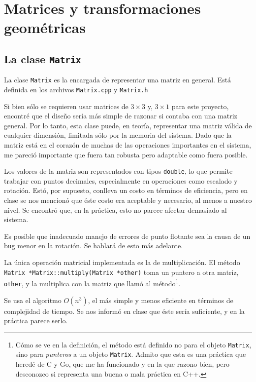 \section{Matrices y transformaciones geométricas}
\label{matrices_transformaciones}

\subsection{La clase \lstinline{Matrix}}

La clase \lstinline!Matrix! es la encargada de representar una matriz en general.
Está definida en los archivos \lstinline!Matrix.cpp! y \lstinline!Matrix.h!

Si bien sólo se requieren usar matrices de $3\times3$ y, $3\times1$ para este proyecto,
encontré que el diseño sería más simple de razonar si contaba con una matriz general.
Por lo tanto, esta clase puede, en teoría, representar una matriz válida de cualquier
dimensión, limitada sólo por la memoria del sistema. Dado que la matriz está en el
corazón de muchas de las operaciones importantes en el sistema, me pareció importante
que fuera tan robusta pero adaptable como fuera posible.

Los valores de la matriz son representados con tipos \lstinline!double!, lo que permite
trabajar con puntos decimales, especialmente en operaciones como escalado y rotación.
Estó, por supuesto, conlleva un costo en términos de eficiencia, pero en clase se nos
mencionó que éste costo era aceptable y necesario, al menos a nuestro nivel. Se encontró
que, en la práctica, esto no parece afectar demasiado al sistema.

Es posible que inadecuado manejo de errores de punto flotante sea la causa de un bug
menor en la rotación. Se hablará de esto más adelante.

La única operación matricial implementada es la de multiplicación. El método
\lstinline!Matrix *Matrix::multiply(Matrix *other)! toma un puntero a otra matriz,
\lstinline!other!, y la multiplica con la matriz que llamó al método\footnote{Cómo
se ve en la definición, el método está definido no para el objeto \lstinline!Matrix!,
sino para \emph{punteros} a un objeto \lstinline!Matrix!. Admito que esta es una práctica
que heredé de C y Go, que me ha funcionado y en la que razono bien, pero desconozco si
representa una buena o mala práctica en C++.}.

Se usa el algoritmo $O(n^3)$, el más simple y menos eficiente en términos de complejidad de tiempo.
Se nos informó en clase que éste sería suficiente, y en la práctica parece serlo.

